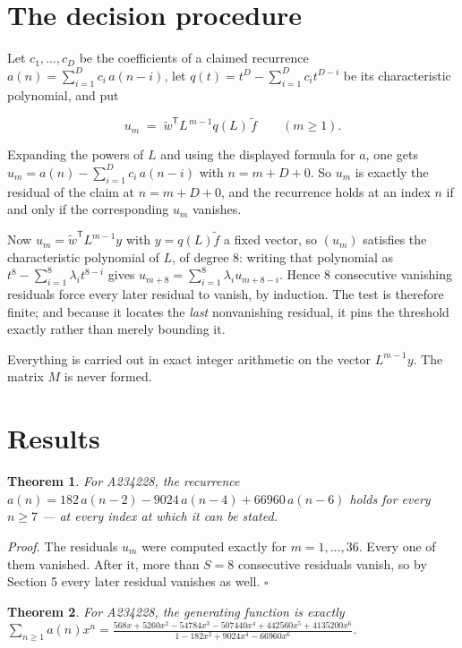 \documentclass[11pt]{article}
\newtheorem{theorem}{Theorem}
\theoremstyle{definition}
\begin{document}
\section{The decision procedure}

Let $c_1,\dots,c_D$ be the coefficients of a claimed recurrence $a(n) = \sum_{i=1}^{D} c_i\,a(n-i)$, let $q(t) = t^{D} - \sum_{i=1}^{D} c_i t^{D-i}$ be its characteristic polynomial, and put

\[u_m \;=\; \tilde w^{\mathsf T} L^{\,m-1} q(L)\,\tilde f \qquad (m \ge 1).\]

Expanding the powers of $L$ and using the displayed formula for $a$, one gets $u_m = a(n) - \sum_{i=1}^{D} c_i\,a(n-i)$ with $n = m + D + 0$. So $u_m$ is exactly the residual of the claim at $n = m + D + 0$, and the recurrence holds at an index $n$ if and only if the corresponding $u_m$ vanishes.

Now $u_m = \tilde w^{\mathsf T} L^{m-1} y$ with $y = q(L)\tilde f$ a fixed vector, so $(u_m)$ satisfies the characteristic polynomial of $L$, of degree $8$: writing that polynomial as $t^{8} - \sum_{i=1}^{8} \lambda_i t^{8-i}$ gives $u_{m+8} = \sum_{i=1}^{8} \lambda_i u_{m+8-i}$. Hence $8$ consecutive vanishing residuals force every later residual to vanish, by induction. The test is therefore finite; and because it locates the {\itshape last} nonvanishing residual, it pins the threshold exactly rather than merely bounding it.

Everything is carried out in exact integer arithmetic on the vector $L^{m-1}y$. The matrix $M$ is never formed.

\section{Results}

\begin{theorem} For A234228, the recurrence $a(n) = 182\,a(n-2) - 9024\,a(n-4) + 66960\,a(n-6)$ holds for every $n \ge 7$ --- at every index at which it can be stated.\end{theorem}

{\itshape Proof.} The residuals $u_m$ were computed exactly for $m = 1,\dots,36$. Every one of them vanished. After it, more than $S = 8$ consecutive residuals vanish, so by Section 5 every later residual vanishes as well. $\square$

\begin{theorem} For A234228, the generating function is exactly $\sum_{n\ge 1} a(n)x^n = \frac{568x + 5260x^{2} - 54784x^{3} - 507440x^{4} + 442560x^{5} + 4135200x^{6}}{1 - 182x^{2} + 9024x^{4} - 66960x^{6}}$.\end{theorem}
\end{document}
